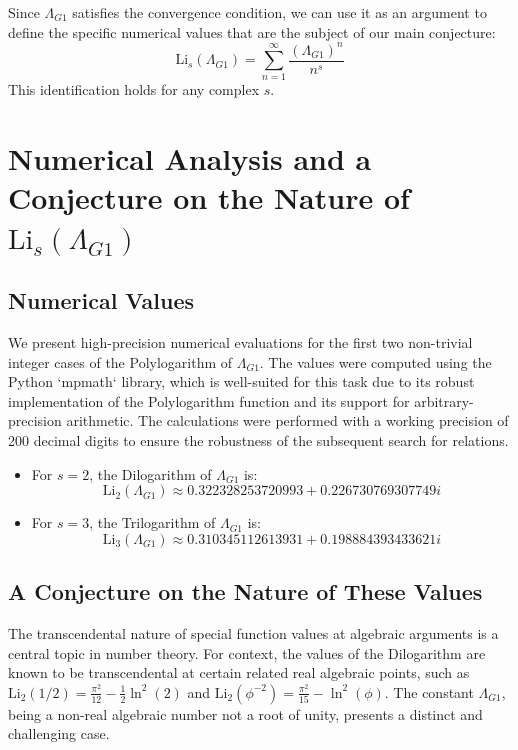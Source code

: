 \documentclass{amsart}
\theoremstyle{plain}
\theoremstyle{definition}
\theoremstyle{remark}
\newcommand{\LambdaG}{\Lambda_{G1}}
\begin{document}
Since $\LambdaG$ satisfies the convergence condition, we can use it as an argument to define the specific numerical values that are the subject of our main conjecture:
$$ \mathrm{Li}_s(\LambdaG) = \sum_{n=1}^{\infty} \frac{(\LambdaG)^{n}}{n^s} $$
This identification holds for any complex $s$.

\section{Numerical Analysis and a Conjecture on the Nature of \texorpdfstring{$\mathrm{Li}_s(\LambdaG)$}{Li\_s(Lambda\_G1)}}

\subsection{Numerical Values}
We present high-precision numerical evaluations for the first two non-trivial integer cases of the Polylogarithm of $\LambdaG$. The values were computed using the Python `mpmath` library, which is well-suited for this task due to its robust implementation of the Polylogarithm function and its support for arbitrary-precision arithmetic. The calculations were performed with a working precision of 200 decimal digits to ensure the robustness of the subsequent search for relations.
\begin{itemize}
    \item For $s=2$, the Dilogarithm of $\LambdaG$ is:
    $$ \mathrm{Li}_2(\LambdaG) \approx 0.322328253720993 + 0.226730769307749i $$
    \item For $s=3$, the Trilogarithm of $\LambdaG$ is:
    $$ \mathrm{Li}_3(\LambdaG) \approx 0.310345112613931 + 0.198884393433621i $$
\end{itemize}

\subsection{A Conjecture on the Nature of These Values}
The transcendental nature of special function values at algebraic arguments is a central topic in number theory. For context, the values of the Dilogarithm are known to be transcendental at certain related real algebraic points, such as $\mathrm{Li}_2(1/2) = \frac{\pi^2}{12} - \frac{1}{2}\ln^2(2)$ and $\mathrm{Li}_2(\phi^{-2}) = \frac{\pi^2}{15} - \ln^2(\phi)$. The constant $\LambdaG$, being a non-real algebraic number not a root of unity, presents a distinct and challenging case.
\end{document}
